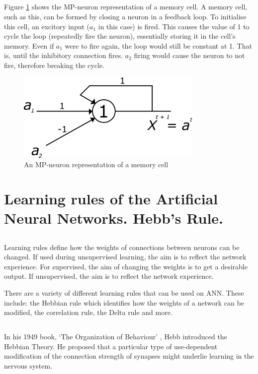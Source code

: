 \documentclass[a4paper]{report}
\begin{document}
\subsection{}
Figure \ref{fig:mem} shows the MP-neuron representation of a memory cell. A memory cell, such as this, can be formed by closing a neuron in a feedback loop. To initialise this cell, an excitory input (\(a_1\) in this case) is fired. This causes the value of 1 to cycle the loop (repeatedly fire the neuron), essentially storing it in the cell's memory. Even if \(a_1\) were to fire again, the loop would still be constant at 1. That is, until the inhibitory connection fires. \(a_2\) firing would cause the neuron to not fire, therefore breaking the cycle.
\begin{figure}[H]
    \centering
    \includegraphics[width=0.8\textwidth]{images/memory.png}
    \caption{An MP-neuron representation of a memory cell}
    \label{fig:mem}
\end{figure}

\section{Learning rules of the Artificial Neural Networks. Hebb’s Rule.}
\subsection{}
Learning rules define how the weights of connections between neurons can be changed. If used during unsupervised learning, the aim is to reflect the network experience. For supervised, the aim of changing the weights is to get a desirable output. If unsupervised, the aim is to reflect the network experience.

There are a variety of different learning rules that can be used on ANN. These include: the Hebbian rule which identifies how the weights of a network can be modified, the correlation rule, the Delta rule and more.

\subsection{}
In his 1949 book, `The Organization of Behaviour' \cite{hebb2005}, Hebb introduced the Hebbian Theory. He proposed that a particular type of use-dependent modification
of the connection strength of synapses might underlie learning in the nervous
system.
\end{document}
